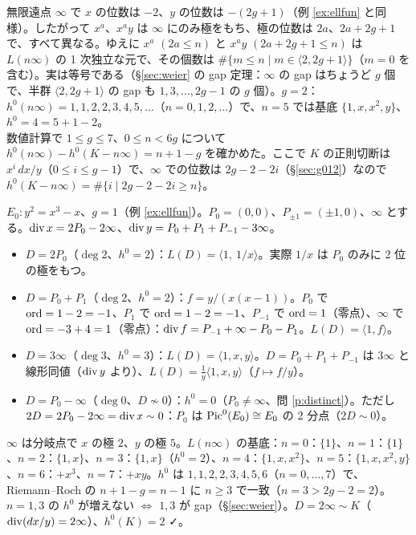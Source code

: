 \begin{ex}[超楕円曲線 $y^2=f(x)$、$\deg f=2g+1$：$h^0(n\infty)$]\label{ex:hyperRR}
無限遠点 $\infty$ で $x$ の位数は $-2$、$y$ の位数は $-(2g+1)$（例 \ref{ex:ellfun} と同様）。したがって $x^a$、$x^ay$ は $\infty$ にのみ極をもち、極の位数は $2a$、$2a+2g+1$ で、すべて異なる。ゆえに $x^a$ $(2a\le n)$ と $x^ay$ $(2a+2g+1\le n)$ は $L(n\infty)$ の 1 次独立な元で、その個数は $\#\{m\le n\mid m\in\langle2,2g+1\rangle\}$（$m=0$ を含む）。実は等号である（\S\ref{sec:weier} の gap 定理：$\infty$ の gap はちょうど $g$ 個で、半群 $\langle2,2g+1\rangle$ の gap も $1,3,\dots,2g-1$ の $g$ 個）。$g=2$：$h^0(n\infty)=1,1,2,2,3,4,5,\dots$（$n=0,1,2,\dots$）で、$n=5$ では基底 $\{1,x,x^2,y\}$、$h^0=4=5+1-2$。\\
数値計算で $1\le g\le7$、$0\le n<6g$ について $h^0(n\infty)-h^0(K-n\infty)=n+1-g$ を確かめた。ここで $K$ の正則切断は $x^i\,dx/y$（$0\le i\le g-1$）で、$\infty$ での位数は $2g-2-2i$（\S\ref{sec:g012}）なので $h^0(K-n\infty)=\#\{i\mid2g-2-2i\ge n\}$。
\end{ex}

\begin{ex}[$y^2=x^3-x$ 上で $L(D)$ を具体的に求める]\label{ex:LDE0}
$E_0:y^2=x^3-x$、$g=1$（例 \ref{ex:ellfun}）。$P_0=(0,0)$、$P_{\pm1}=(\pm1,0)$、$\infty$ とする。$\operatorname{div} x=2P_0-2\infty$、$\operatorname{div} y=P_0+P_1+P_{-1}-3\infty$。
\begin{itemize}
\item $D=2P_0$（$\deg2$、$h^0=2$）：$L(D)=\langle1,\ 1/x\rangle$。実際 $1/x$ は $P_0$ のみに 2 位の極をもつ。
\item $D=P_0+P_1$（$\deg2$、$h^0=2$）：$f=y/(x(x-1))$。$P_0$ で $\operatorname{ord}=1-2=-1$、$P_1$ で $\operatorname{ord}=1-2=-1$、$P_{-1}$ で $\operatorname{ord}=1$（零点）、$\infty$ で $\operatorname{ord}=-3+4=1$（零点）：$\operatorname{div} f=P_{-1}+\infty-P_0-P_1$。$L(D)=\langle1,f\rangle$。
\item $D=3\infty$（$\deg3$、$h^0=3$）：$L(D)=\langle1,x,y\rangle$。$D=P_0+P_1+P_{-1}$ は $3\infty$ と線形同値（$\operatorname{div} y$ より）、$L(D)=\frac1y\langle1,x,y\rangle$（$f\mapsto f/y$）。
\item $D=P_0-\infty$（$\deg0$、$D\not\sim0$）：$h^0=0$（$P_0\ne\infty$、問 \ref{p:distinct}）。ただし $2D=2P_0-2\infty=\operatorname{div} x\sim0$：$P_0$ は $\mathrm{Pic}^0(E_0)\cong E_0$ の 2 分点（$2D\sim0$）。
\end{itemize}
\end{ex}
\begin{ex}[$y^2=x^5-x$（$g=2$）：gap との対応]\label{ex:g2gap}
$\infty$ は分岐点で $x$ の極 $2$、$y$ の極 $5$。$L(n\infty)$ の基底：$n=0$：$\{1\}$、$n=1$：$\{1\}$、$n=2$：$\{1,x\}$、$n=3$：$\{1,x\}$（$h^0=2$）、$n=4$：$\{1,x,x^2\}$、$n=5$：$\{1,x,x^2,y\}$、$n=6$：$+x^3$、$n=7$：$+xy$。$h^0$ は $1,1,2,2,3,4,5,6$（$n=0,\dots,7$）で、Riemann--Roch の $n+1-g=n-1$ に $n\ge3$ で一致（$n=3>2g-2=2$）。$n=1,3$ の $h^0$ が増えない $\iff$ $1,3$ が gap（\S\ref{sec:weier}）。$D=2\infty\sim K$（$\operatorname{div}(dx/y)=2\infty$）、$h^0(K)=2$ ✓。
\end{ex}

